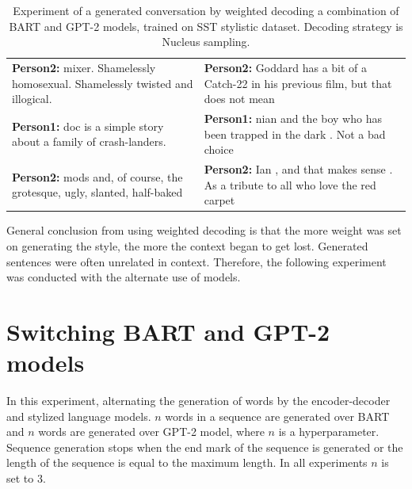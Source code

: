 \begin{table}[H]
\begin{tabular}{|p{7cm}|p{7cm}|}
 \textbf{Person2:} mixer. Shamelessly homosexual. Shamelessly twisted and illogical. & \textbf{Person2:} Goddard has a bit of a Catch-22 in his previous film, but that does not mean \\
 \textbf{Person1:} doc is a simple story about a family of crash-landers. & \textbf{Person1:} nian and the boy who has been trapped in the dark .  Not a bad choice \\
 \textbf{Person2:} mods and, of course, the grotesque, ugly, slanted, half-baked & \textbf{Person2:}  Ian , and that makes sense .  As a tribute to all who love the red carpet \\
 \hline
 \end{tabular}
 \caption{Experiment of a generated conversation by weighted decoding a combination of BART and GPT-2 models, trained on SST stylistic dataset. Decoding strategy is Nucleus sampling.}
\label{tab:sst_wd_nucleus}
\end{table}


General conclusion from using weighted decoding is that the more weight was set on generating the style, the more the context began to get lost. Generated sentences were often unrelated in context. Therefore, the following experiment was conducted with the alternate use of models.

\section{Switching BART and GPT-2 models}
In this experiment, alternating the generation of words by the encoder-decoder and stylized language models. $n$ words in a sequence are generated over BART and $n$ words are generated over GPT-2 model, where $n$ is a hyperparameter. Sequence generation stops when the end mark of the sequence is generated or the length of the sequence is equal to the maximum length. In all experiments $n$ is set to 3.

